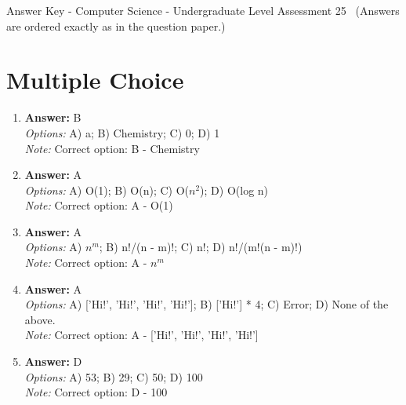 \documentclass[12pt]{article}
\begin{document}
\begin{center}
Answer Key - Computer Science - Undergraduate Level Assessment 25 \
\small (Answers are ordered exactly as in the question paper.)
\end{center}

\section*{Multiple Choice}
\begin{enumerate}[label=\arabic*.]
\item \textbf{Answer:} B
\\ \textit{Options:} A) a; B) Chemistry; C) 0; D) 1
\\ \textit{Note:} Correct option: B - Chemistry
\item \textbf{Answer:} A
\\ \textit{Options:} A) O(1); B) O(n); C) O($n^2$); D) O(log n)
\\ \textit{Note:} Correct option: A - O(1)
\item \textbf{Answer:} A
\\ \textit{Options:} A) $n^m$; B) n!/(n - m)!; C) n!; D) n!/(m!(n - m)!)
\\ \textit{Note:} Correct option: A - $n^m$
\item \textbf{Answer:} A
\\ \textit{Options:} A) ['Hi!', 'Hi!', 'Hi!', 'Hi!']; B) ['Hi!'] * 4; C) Error; D) None of the above.
\\ \textit{Note:} Correct option: A - ['Hi!', 'Hi!', 'Hi!', 'Hi!']
\item \textbf{Answer:} D
\\ \textit{Options:} A) 53; B) 29; C) 50; D) 100
\\ \textit{Note:} Correct option: D - 100
\end{enumerate}
\end{document}
